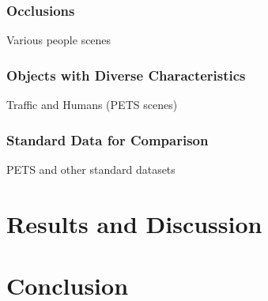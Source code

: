 \documentclass{article}
\begin{document}
\subsubsection{Occlusions}
%
Various people scenes

\subsubsection{Objects with Diverse Characteristics}
%
Traffic and Humans (PETS scenes)

\subsubsection{Standard Data for Comparison}
%
PETS and other standard datasets




\section*{Results and Discussion}





\section*{Conclusion}















\begin{small}

 
\end{small}
\end{document}
